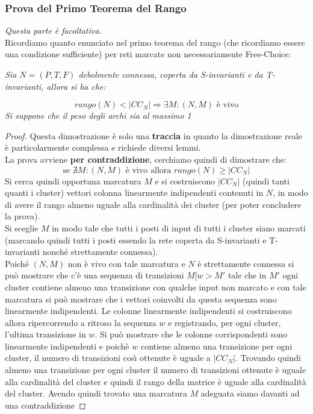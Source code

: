 \documentclass[a4paper,12pt, oneside]{book}
\begin{document}
\subsubsection{Prova del Primo Teorema del Rango}
\textit{Questa parte è facoltativa.}\\
Ricordiamo quanto enunciato nel primo teorema del rango (che ricordiamo essere
una condizione sufficiente) per reti marcate non necessariamente Free-Choice:
\begin{center}
  \textit{Sia $N = (P, T , F )$ debolmente connessa, coperta da S-invarianti e
    da T-invarianti, allora si ha che:} 
\end{center}
\[rango(N)<|CC_N|\Rightarrow \exists M:(N,M) \mbox{ è vivo}\]
\textit{Si suppone che il peso degli archi sia al massimo 1}
\begin{proof}
  Questa dimostrazione è solo una \textbf{traccia} in quanto la dimostrazione
  reale è particolarmente complessa e richiede diversi lemmi.\\
  La prova avviene \textbf{per contraddizione}, cerchiamo quindi di dimostrare
  che:
  \[\mbox{se }\nexists M:(N,M) \mbox{ è vivo allora }rango(N)\geq |CC_N|\]
  Si cerca quindi opportuna marcatura $M$ e si costruiscono $|CC_N|$ (quindi
  tanti quanti i cluster) vettori colonna linearmente indipendenti contenuti in
  $N$, in modo di avere il rango almeno uguale alla cardinalità dei cluster
  (per poter concludere la prova).\\ 
  Si sceglie $M$ in modo tale che tutti i posti di input di tutti i cluster
  siano marcati (marcando quindi tutti i posti essendo la rete coperta da
  S-invarianti e T-invarianti nonché strettamente connessa).\\
  Poiché $(N, M)$ non è vivo con tale marcatura e $N$ è strettamente connessa
  si può mostrare che c’è una sequenza di transizioni $M[w>M'$ tale che in $M'$
  ogni cluster contiene almeno una transizione con qualche input non marcato e
  con tale marcatura si può mostrare che i vettori coinvolti da questa sequenza
  sono linearmente indipendenti. Le colonne linearmente indipendenti si
  costruiscono allora ripercorrendo a ritroso la sequenza $w$ e registrando,
  per ogni cluster, l’ultima transizione in $w$. Si può mostrare che le colonne
  corrispondenti sono linearmente indipendenti e poichè $w$ contiene almeno una
  transizione per ogni cluster, il numero di transizioni cosı̀ ottenute è uguale
  a $|CC_N|$. Trovando quindi almeno una transizione per ogni cluster il numero
  di transizioni ottenute è uguale alla cardinalità del cluster e quindi
  il rango della matrice è uguale alla cardinalità del cluster. Avendo quindi
  trovato una marcatura $M$ adeguata siamo davanti ad una contraddizione
\end{proof}
\end{document}
